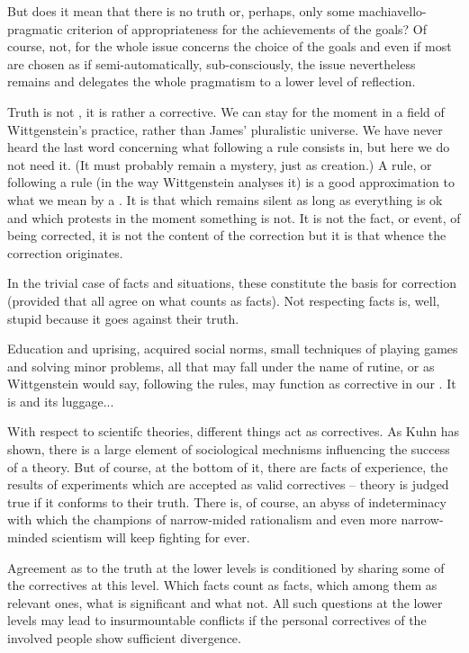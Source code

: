 But does it mean that there is no truth or, perhaps, only some machiavello-pragmatic
criterion of appropriateness for the achievements of the goals? Of course, not,
for the whole issue concerns the choice of the goals and even if most are chosen
as if semi-automatically, sub-consciously, the issue nevertheless remains and
delegates the whole pragmatism to a lower level of reflection.

Truth is not , it is rather a corrective. We can stay for the
moment in a field of Wittgenstein's practice, rather than James' pluralistic
universe. We have never heard the last word concerning what following a rule
consists in, but here we do not need it. (It must probably remain a mystery,
just as creation.) A rule, or following a rule (in the way
Wittgenstein analyses it) is a good approximation to what we mean by a
. It is that which remains silent as long as everything is ok and
which protests in the moment something is not. It is not the fact, or event, of
being corrected, it is not the content of the correction but it is that whence
the correction originates.

\imm In the trivial case of facts and situations, these constitute the basis for
correction (provided that all agree on what counts as facts). Not respecting
facts is, well, stupid because it goes against their truth.

\act Education and uprising, acquired social norms, small techniques of playing
games and solving minor problems, all that may fall under the name of rutine, or
as Wittgenstein would say, following the rules, may function as corrective in
our . It is  and its luggage...

With respect to scientifc theories, different things act as correctives. As Kuhn
has shown, there is a large element of sociological mechnisms influencing the
success of a theory. But of course, at the bottom of it, there are facts of
experience, the results of experiments which are accepted as valid correctives
-- theory is judged true if it conforms to their truth. There is, of course, an
abyss of indeterminacy with which the champions of narrow-mided rationalism and 
even more narrow-minded scientism will keep fighting for ever. 

\mine 
Agreement as to the truth at the lower levels is conditioned by sharing some of
the correctives at this level. Which facts count as facts, which among them as
relevant ones, what is significant and what not. All such questions at the lower
levels may lead to insurmountable conflicts if the personal correctives of the
involved people show sufficient divergence.

